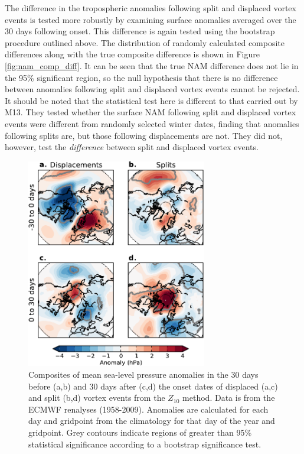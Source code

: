 The difference in the tropospheric anomalies following split and displaced
vortex events is tested more robustly by examining surface anomalies averaged
over the 30 days following onset. This difference is again tested using the
bootstrap procedure outlined above. The distribution of randomly calculated
composite differences along with the true composite difference is shown in
Figure \ref{fig:nam_comp_diff}. It can be seen that the true NAM difference does
not lie in the 95\% significant region, so the null hypothesis that there is no
difference between anomalies following split and displaced vortex events cannot
be rejected. It should be noted that the statistical test here is different to
that carried out by M13. They tested whether the surface NAM following split and
displaced vortex events were different from randomly selected winter dates,
finding that anomalies following splits are, but those following displacements
are not. They did not, however, test the \emph{difference} between split and
displaced vortex events. 

\begin{figure}
 \centering
 \noindent\includegraphics[width=0.7\textwidth]{figures/chapter-moments/mslp_composites_colbar_crop.pdf}
 \caption[Mean sea-level pressure composites for split and displaced vortex
 events.]{Composites of mean sea-level pressure anomalies in the 30 days before
   (a,b) and 30 days after (c,d) the onset dates of displaced (a,c) and split
   (b,d) vortex events from the $Z_{10}$ method. Data is from the ECMWF
   renalyses (1958-2009). Anomalies are calculated for each day and gridpoint
   from the climatology for that day of the year and gridpoint. Grey contours
   indicate regions of greater than 95\% statistical significance according to a
   bootstrap significance test.}
 \label{fig:mslp_composites}
\end{figure}

